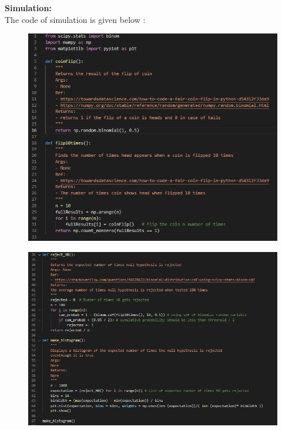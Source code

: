 \documentclass[answers]{exam}
\begin{document}
\begin{framed}
\textbf{Simulation:}\\
The code of simulation is given below : \\ 
\begin{figure}[H] %
    \centering
    \includegraphics[width= 1 \textwidth]{Q5.1_code1.PNG}
\end{figure}

\begin{figure}[H] %
    \centering
    \includegraphics[width= 1 \textwidth]{Q5.1_code2.PNG}
\end{figure}


\end{framed}
\end{document}

